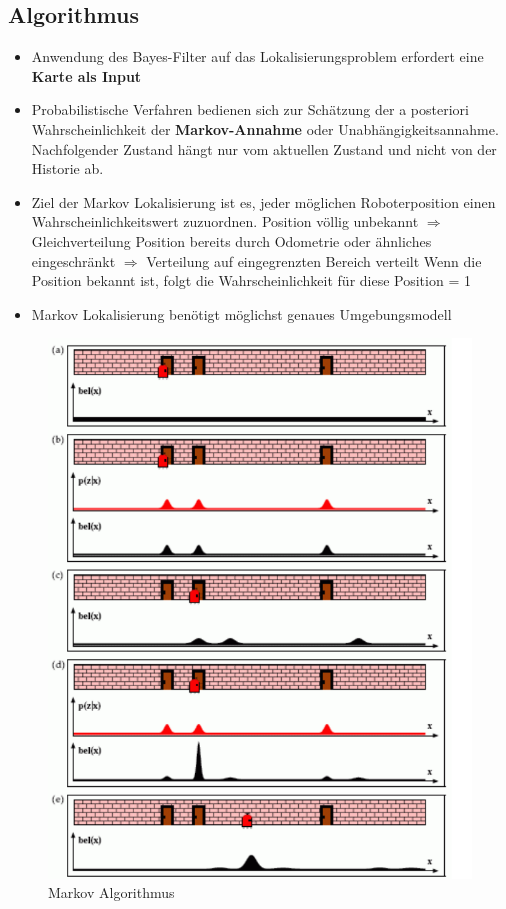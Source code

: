 \subsection{Algorithmus}
\begin{itemize}
	\item Anwendung des Bayes-Filter auf das Lokalisierungsproblem erfordert eine \textbf{Karte als Input}
	\item Probabilistische Verfahren bedienen sich zur Schätzung der a posteriori Wahrscheinlichkeit der \textbf{Markov-Annahme} oder Unabhängigkeitsannahme.
	Nachfolgender Zustand hängt nur vom aktuellen Zustand und nicht von der Historie ab.
	\item Ziel der Markov Lokalisierung ist es, jeder möglichen Roboterposition einen Wahrscheinlichkeitswert zuzuordnen.
	\subitem Position völlig unbekannt $\Rightarrow$ Gleichverteilung
	\subitem Position bereits durch Odometrie oder ähnliches eingeschränkt $\Rightarrow$ Verteilung auf eingegrenzten Bereich verteilt
	\subitem Wenn die Position bekannt ist, folgt die Wahrscheinlichkeit für diese Position = 1
\end{itemize}
\begin{itemize}
	\item Markov Lokalisierung benötigt möglichst genaues Umgebungsmodell
\end{itemize}
\begin{figure}[H]
	\begin{center}
		\includegraphics[scale=0.6]{Resources/PNG/MarkovAlgorithmus.PNG}
		\caption{Markov Algorithmus}
		\label{fig:Resources/PNG/MarkovAlgorithmus.PNG}
	\end{center}
\end{figure}
\newpage

